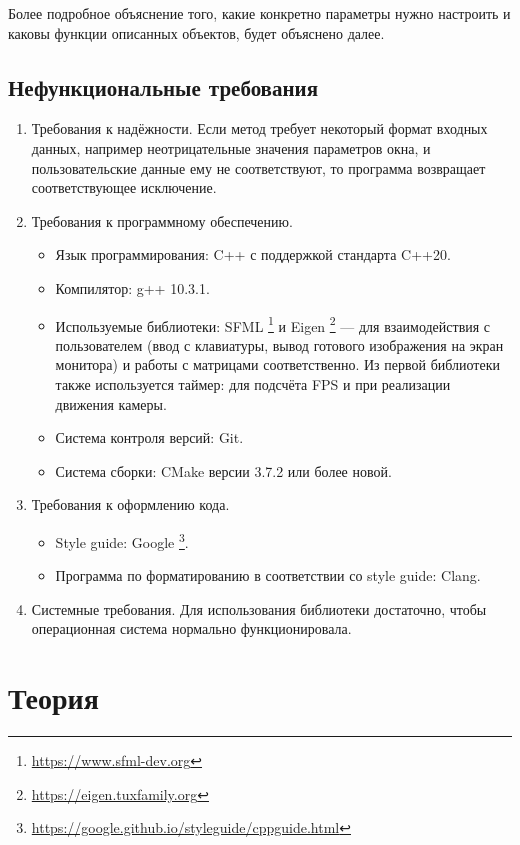 \documentclass{article}
\begin{document}
Более подробное объяснение того, какие конкретно параметры нужно настроить и каковы функции описанных объектов, будет объяснено далее.

\subsection{Нефункциональные требования}

\begin{enumerate}
	\item Требования к надёжности.
	Если метод требует некоторый формат входных данных, например неотрицательные значения параметров окна, и пользовательские данные ему не соответствуют, то программа возвращает соответствующее исключение.
	\item Требования к программному обеспечению.
	\begin{itemize}
		\item Язык программирования: C++ с поддержкой стандарта C++20.
		\item Компилятор: g++ 10.3.1.
		\item Используемые библиотеки: SFML \footnote{\url{https://www.sfml-dev.org}} и Eigen \footnote{\url{https://eigen.tuxfamily.org}} --- для взаимодействия с пользователем (ввод с клавиатуры, вывод готового изображения на экран монитора) и работы с матрицами соответственно.
		Из первой библиотеки также используется таймер: для подсчёта FPS и при реализации движения камеры.
		\item Система контроля версий: Git.
		\item Система сборки: CMake версии 3.7.2 или более новой.
	\end{itemize}
	\item Требования к оформлению кода.
	\begin{itemize}
		\item Style guide: Google \footnote{\url{https://google.github.io/styleguide/cppguide.html}}.
		\item Программа по форматированию в соответствии со style guide: Clang.
	\end{itemize}
	\item Системные требования.
	Для использования библиотеки достаточно, чтобы операционная система нормально функционировала.
\end{enumerate}

\newpage

\section{Теория}
\end{document}
